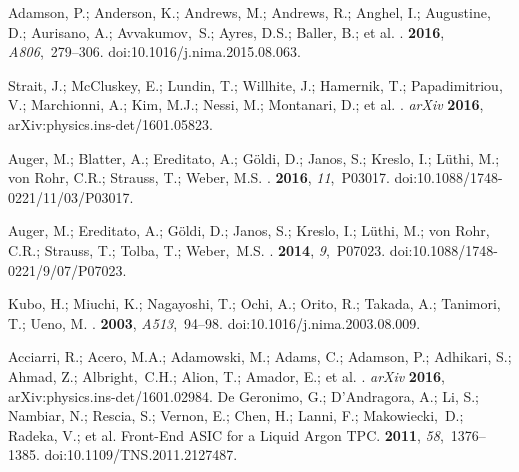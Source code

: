 \documentclass[instruments,article,accept,moreauthors,pdftex]{Definitions/mdpi}
\begin{document}
\begin{thebibliography}{999}
Adamson, P.; Anderson, K.; Andrews, M.; Andrews, R.; Anghel, I.; Augustine, D.; Aurisano, A.; Avvakumov,~S.; Ayres, D.S.; Baller, B.; et al.
.
 {\bf 2016}, {\em A806},~279--306.
\newblock
  doi:10.1016/j.nima.2015.08.063.

Strait, J.; McCluskey, E.; Lundin, T.; Willhite, J.; Hamernik, T.; Papadimitriou, V.; Marchionni, A.; Kim, M.J.; Nessi, M.; Montanari, D.; et al.
.  \emph{arXiv} {\bf 2016}, arXiv:physics.ins-det/1601.05823.

Auger, M.; Blatter, A.; Ereditato, A.; Göldi, D.; Janos, S.; Kreslo, I.; Lüthi, M.; von Rohr, C.R.; Strauss, T.; Weber, M.S.
.
 {\bf 2016}, {\em 11},~P03017.
\newblock
  doi:10.1088/1748-0221/11/03/P03017.

Auger, M.; Ereditato, A.; Göldi, D.; Janos, S.; Kreslo, I.; Lüthi, M.; von Rohr, C.R.; Strauss, T.; Tolba, T.; Weber,~M.S.
.
 {\bf 2014}, {\em 9},~P07023.
\newblock
  doi:10.1088/1748-0221/9/07/P07023.

Kubo, H.; Miuchi, K.; Nagayoshi, T.; Ochi, A.; Orito, R.; Takada, A.; Tanimori, T.; Ueno, M.
.
 {\bf 2003}, {\em A513},~94--98.
\newblock
  doi:10.1016/j.nima.2003.08.009.

Acciarri, R.; Acero, M.A.; Adamowski, M.; Adams, C.; Adamson, P.; Adhikari, S.; Ahmad, Z.; Albright,~C.H.; Alion, T.; Amador, E.; et al.
. \emph{arXiv} {\bf 2016}, arXiv:physics.ins-det/1601.02984.  
De Geronimo, G.; D'Andragora, A.; Li, S.; Nambiar, N.; Rescia, S.; Vernon, E.; Chen, H.; Lanni, F.; Makowiecki,~D.; Radeka, V.; et al.
\newblock Front-End ASIC for a Liquid Argon TPC.
 {\bf 2011}, {\em
  58},~1376--1385.
\newblock
  doi:10.1109/TNS.2011.2127487.


\end{thebibliography}
\end{document}
